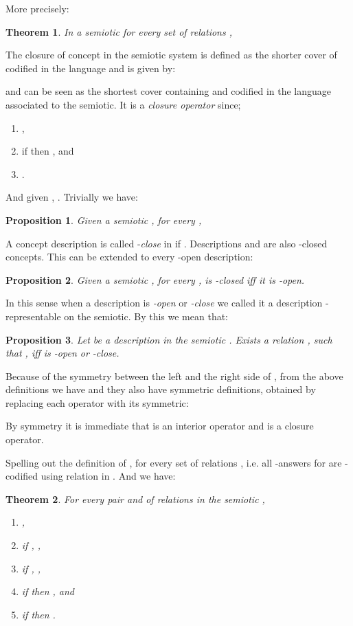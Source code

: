\documentclass[oribibl]{llncs}
\newtheorem{thm}{Theorem}
\newtheorem{prop}{Proposition}
\begin{document}
More precisely:

\begin{thm}
In a semiotic for every set of relations ,

\end{thm}

The closure of concept  in the semiotic system  is defined
as the shorter cover of  codified in the language   and
is given by:

and can be seen as the shortest cover containing  and codified in
the language associated to the semiotic. It is a \emph{closure
operator} since;
\begin{enumerate}
  \item ,
  \item if  then , and
  \item .
\end{enumerate}
And given , . Trivially we have:

\begin{prop}
Given a semiotic , for every ,

\end{prop}

A concept description  is called -\emph{close} in
 if
.
Descriptions  and  are also
-closed concepts. This can be extended to every
-open description:

\begin{prop}
Given a semiotic , for every ,  is
-closed iff it is -open.
\end{prop}

In this sense when a description is \emph{-open} or
\emph{-close} we called it a description -representable
on the semiotic. By this we mean that:

\begin{prop}
Let  be a description in the semiotic . Exists a relation
, such that , iff  is -open or
-close.
\end{prop}

Because of the symmetry between the left and the right side of
, from the above definitions we have
 and they also have
symmetric definitions, obtained by replacing each operator with its
symmetric:

 By symmetry it is immediate that  is an interior operator and  is a
closure operator.

Spelling out the definition of , for every set of
relations ,
 i.e. all -answers for  are
-codified using relation in . And we have:

\begin{thm}\label{soundness}
For every pair  and  of relations in the semiotic ,
\begin{enumerate}
  \item ,
  \item if , ,
  \item if , ,
  \item if  then , and
  \item if  then .
\end{enumerate}
\end{thm}
\end{document}
